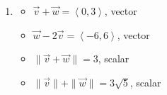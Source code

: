 \documentclass{ximera}
\begin{document}
\begin{enumerate}
\begin{multicols}{2}
\begin{itemize}
\end{itemize}

\end{multicols}

\begin{multicols}{2}

\begin{itemize}

\item $\| \vec{v} + \vec{w} \| = 12\sqrt{2}$, scalar
\item  $\| \vec{v} \| + \| \vec{w}\| = 38$, scalar

\end{itemize}

\end{multicols}

\begin{multicols}{2}

\begin{itemize}

\item $\| \vec{v} \| \vec{w} - \| \vec{w} \| \vec{v}  = \left<-34,-612\right>$, vector
\item $\|w\| \hat{v}= \left<-\frac{91}{25}, \frac{312}{25} \right>$, vector

\end{itemize}

\end{multicols}

\item  

\begin{multicols}{2}

\begin{itemize}

\item  $\vec{v} + \vec{w} = \left<0,3\right> $, vector
\item  $\vec{w}  - 2\vec{v}  = \left<-6,6 \right>$, vector

\end{itemize}

\end{multicols}

\begin{multicols}{2}

\begin{itemize}

\item $\| \vec{v} + \vec{w} \| = 3$, scalar
\item  $\| \vec{v} \| + \| \vec{w}\| = 3\sqrt{5}$, scalar


\end{itemize}
\end{multicols}
\end{enumerate}
\end{document}

